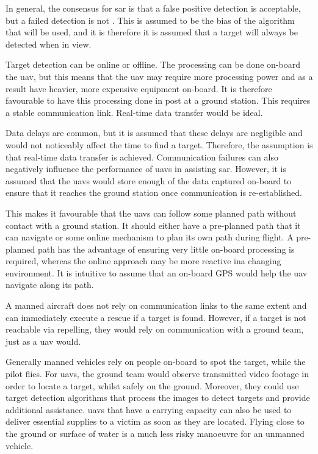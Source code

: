 In general, the consensus for \ac{sar} is that a false positive detection is acceptable, but a failed detection is not \cite{}. This is assumed to be the bias of the algorithm that will be used, and it is therefore it is assumed that a target will always be detected when in view. 

Target detection can be online or offline. The processing can be done on-board the \ac{uav}, but this means that the \ac{uav} may require more processing power and as a result have heavier, more expensive equipment on-board. It is therefore favourable to have this processing done in post at a ground station. This requires a stable communication link. Real-time data transfer would be ideal.

Data delays are common, but it is assumed that these delays are negligible and would not noticeably affect the time to find a target. Therefore, the assumption is that real-time data transfer is achieved. Communication failures can also negatively influence the performance of \acp{uav} in assisting \ac{sar}. However, it is assumed that the \acp{uav} would store enough of the data captured on-board to ensure that it reaches the ground station once communication is re-established. 

This makes it favourable that the \acp{uav} can follow some planned path without contact with a ground station. It should either have a pre-planned path that it can navigate or some online mechanism to plan its own path during flight. A pre-planned path has the advantage of ensuring very little on-board processing is required, whereas the online approach may be more reactive ina  changing environment. It is intuitive to assume that an on-board GPS would help the \ac{uav} navigate along its path.

A manned aircraft does not rely on communication links to the same extent and can immediately execute a rescue if a target is found. However, if a target is not reachable via repelling, they would rely on communication with a ground team, just as a \ac{uav} would.

Generally manned vehicles rely on people on-board to spot the target, while the pilot flies. For \acp{uav}, the ground team would observe transmitted video footage in order to locate a target, whilst safely on the ground. Moreover, they could use target detection algorithms that process the images to detect targets and provide additional assistance. \acp{uav} that have a carrying capacity can also be used to deliver essential supplies to a victim as soon as they are located. Flying close to the ground or surface of water is a much less risky manoeuvre for an unmanned vehicle. 

